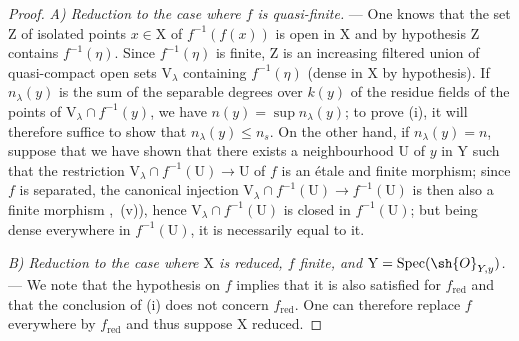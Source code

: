 \begin{proof}
\emph{A) Reduction to the case where $f$ is quasi-finite.} ---
One knows  that the set $\mathrm{Z}$ of isolated points $x\in\mathrm{X}$ of $f^{-1}(f(x))$ is open in $\mathrm{X}$ and by hypothesis $\mathrm{Z}$ contains $f^{-1}(\eta)$.
Since $f^{-1}(\eta)$ is finite, $\mathrm{Z}$ is an increasing filtered union of quasi-compact open sets $\mathrm{V}_\lambda$ containing $f^{-1}(\eta)$ (dense in $\mathrm{X}$ by hypothesis).
If $n_\lambda(y)$ is the sum of the separable degrees over $k(y)$ of the residue fields of the points of $\mathrm{V}_\lambda\cap f^{-1}(y)$, we have $n(y)=\sup n_\lambda(y)$; to prove (i), it will therefore suffice to show that $n_\lambda(y)\leq n_s$.
On the other hand, if $n_\lambda(y)=n$, suppose that we have shown that there exists a neighbourhood $\mathrm{U}$ of $y$ in $\mathrm{Y}$ such that the restriction $\mathrm{V}_\lambda\cap f^{-1}(\mathrm{U})\to\mathrm{U}$ of $f$ is an \'etale and finite morphism; since $f$ is separated, the canonical injection $\mathrm{V}_\lambda\cap f^{-1}(\mathrm{U})\to f^{-1}(\mathrm{U})$ is then also a finite morphism ,~(v)), hence $\mathrm{V}_\lambda\cap f^{-1}(\mathrm{U})$ is closed in $f^{-1}(\mathrm{U})$; but being dense everywhere in $f^{-1}(\mathrm{U})$, it is necessarily equal to it.

\emph{B) Reduction to the case where $\mathrm{X}$ is reduced, $f$ finite, and $\mathrm{Y}=\operatorname{Spec}(\sh{O}_{Y,y})$.} ---
We note that the hypothesis on $f$ implies that it is also satisfied for $f_{\mathrm{red}}$ and that the conclusion of (i) does not concern $f_{\mathrm{red}}$.
One can therefore replace $f$ everywhere by $f_{\mathrm{red}}$ and thus suppose $\mathrm{X}$ reduced.


\end{proof}
